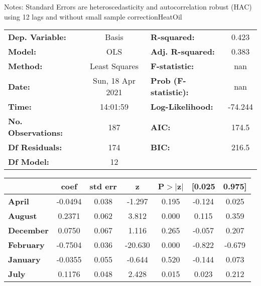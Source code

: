 Notes: \newline
 [1] Standard Errors are heteroscedasticity and autocorrelation robust (HAC) using 12 lags and without small sample correctionHeatOil\begin{center}
\begin{tabular}{lclc}
\toprule
\textbf{Dep. Variable:}    &      Basis       & \textbf{  R-squared:         } &     0.423   \\
\textbf{Model:}            &       OLS        & \textbf{  Adj. R-squared:    } &     0.383   \\
\textbf{Method:}           &  Least Squares   & \textbf{  F-statistic:       } &       nan   \\
\textbf{Date:}             & Sun, 18 Apr 2021 & \textbf{  Prob (F-statistic):} &      nan    \\
\textbf{Time:}             &     14:01:59     & \textbf{  Log-Likelihood:    } &   -74.244   \\
\textbf{No. Observations:} &         187      & \textbf{  AIC:               } &     174.5   \\
\textbf{Df Residuals:}     &         174      & \textbf{  BIC:               } &     216.5   \\
\textbf{Df Model:}         &          12      & \textbf{                     } &             \\
\bottomrule
\end{tabular}
\begin{tabular}{lcccccc}
                   & \textbf{coef} & \textbf{std err} & \textbf{z} & \textbf{P$> |$z$|$} & \textbf{[0.025} & \textbf{0.975]}  \\
\midrule
\textbf{April}     &      -0.0494  &        0.038     &    -1.297  &         0.195        &       -0.124    &        0.025     \\
\textbf{August}    &       0.2371  &        0.062     &     3.812  &         0.000        &        0.115    &        0.359     \\
\textbf{December}  &       0.0750  &        0.067     &     1.116  &         0.265        &       -0.057    &        0.207     \\
\textbf{February}  &      -0.7504  &        0.036     &   -20.630  &         0.000        &       -0.822    &       -0.679     \\
\textbf{January}   &      -0.0355  &        0.055     &    -0.644  &         0.520        &       -0.144    &        0.073     \\
\textbf{July}      &       0.1176  &        0.048     &     2.428  &         0.015        &        0.023    &        0.212     \\

\end{tabular}
\end{center}
